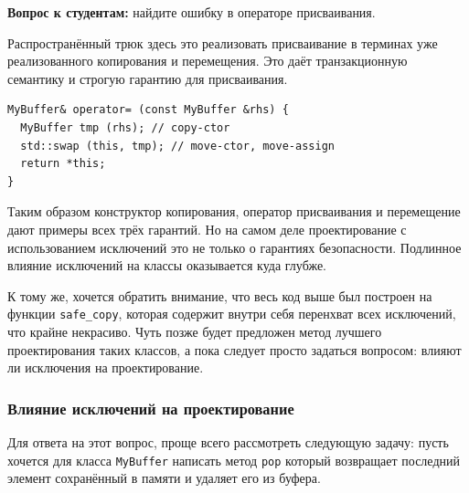\documentclass[a4paper,12pt,oneside]{article}
\newif\ifanswers
\begin{document}
\textbf{Вопрос к студентам:} найдите ошибку в операторе присваивания.

\ifanswers
Правильный ответ: из \lstinline!safe_copy! может прилететь исключение, а содержимое уже стёрто. В этот момент объект приходит в неконсистентное состояние.

Можно даже показать как исправить эту проблему.

\begin{lstlisting}
MyBuffer& operator= (const MyBuffer &rhs) {
  if (this == &rhs) return *this;
  T *narr = safe_copy(rhs.arr_, rhs.size_);
  delete [] arr_;
  arr_ = narr;
  size_ = rhs.size_; used_ = rhs.used_;
  return *this;
}
\end{lstlisting}

Но ниже всё равно будет приведён более радикальный способ исправления.
\fi

Распространённый трюк здесь это реализовать присваивание в терминах уже реализованного копирования и перемещения. Это даёт транзакционную семантику и строгую гарантию для присваивания.

\begin{lstlisting}
MyBuffer& operator= (const MyBuffer &rhs) {
  MyBuffer tmp (rhs); // copy-ctor
  std::swap (this, tmp); // move-ctor, move-assign
  return *this;
}
\end{lstlisting}

Таким образом конструктор копирования, оператор присваивания и перемещение дают примеры всех трёх гарантий. Но на самом деле проектирование с использованием исключений это не только о гарантиях безопасности. Подлинное влияние исключений на классы оказывается куда глубже.

К тому же, хочется обратить внимание, что весь код выше был построен на функции \lstinline!safe_copy!, которая содержит внутри себя перенхват всех исключений, что крайне некрасиво. Чуть позже будет предложен метод лучшего проектирования таких классов, а пока следует просто задаться вопросом: влияют ли исключения на проектирование.

\subsubsection{Влияние исключений на проектирование}\label{subsub:excimportance}

Для ответа на этот вопрос, проще всего рассмотреть следующую задачу: пусть хочется для класса \lstinline!MyBuffer! написать метод \lstinline!pop! который возвращает последний элемент сохранённый в памяти и удаляет его из буфера.
\end{document}
